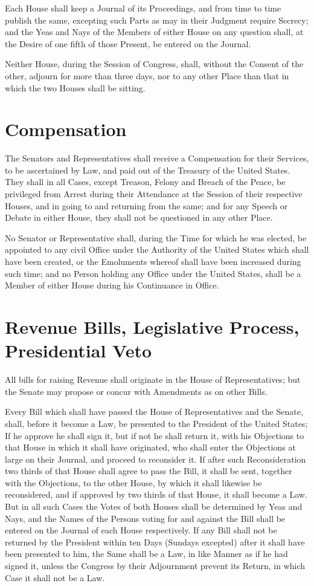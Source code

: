 \documentclass{constitution}
\begin{document}
Each House shall keep a Journal of its Proceedings,
and from time to time publish the same,
excepting such Parts as may in their Judgment require Secrecy;
and the Yeas and Nays of the Members of either House on any question shall,
at the Desire of one fifth of those Present,
be entered on the Journal.

Neither House, during the Session of Congress, shall, without the Consent of the other,
adjourn for more than three days,
nor to any other Place than that in which the two Houses shall be sitting.

\section{Compensation}
The Senators and Representatives shall receive a Compensation for their Services,
to be ascertained by Law, and paid out of the Treasury of the United States.
They shall in all Cases, except Treason, Felony and Breach of the Peace,
be privileged from Arrest during their Attendance at the Session of their respective Houses,
and in going to and returning from the same;
and for any Speech or Debate in either House, they shall not be questioned in any other Place.

No Senator or Representative shall, during the Time for which he was elected,
be appointed to any civil Office under the Authority of the United States
which shall have been created,
or the Emoluments whereof shall have been increased during such time;
and no Person holding any Office under the United States,
shall be a Member of either House during his Continuance in Office.

\section{Revenue Bills, Legislative Process, Presidential Veto}
All bills for raising Revenue shall originate in the House of Representatives;
but the Senate may propose or concur with Amendments as on other Bills.

Every Bill which shall have passed the House of Representatives and the Senate,
shall, before it become a Law, be presented to the President of the United States;
If he approve he shall sign it,
but if not he shall return it, with his Objections to that House in which it shall have originated,
who shall enter the Objections at large on their Journal, and proceed to reconsider it.
If after such Reconsideration two thirds of that House shall agree to pass the Bill,
it shall be sent, together with the Objections,
to the other House, by which it shall likewise be reconsidered,
and if approved by two thirds of that House, it shall become a Law.
But in all such Cases the Votes of both Houses shall be determined by Yeas and Nays,
and the Names of the Persons voting for and against the Bill
shall be entered on the Journal of each House respectively.
If any Bill shall not be returned by the President within ten Days (Sundays excepted)
after it shall have been presented to him,
the Same shall be a Law, in like Manner as if he had signed it,
unless the Congress by their Adjournment prevent its Return,
in which Case it shall not be a Law.
\end{document}
